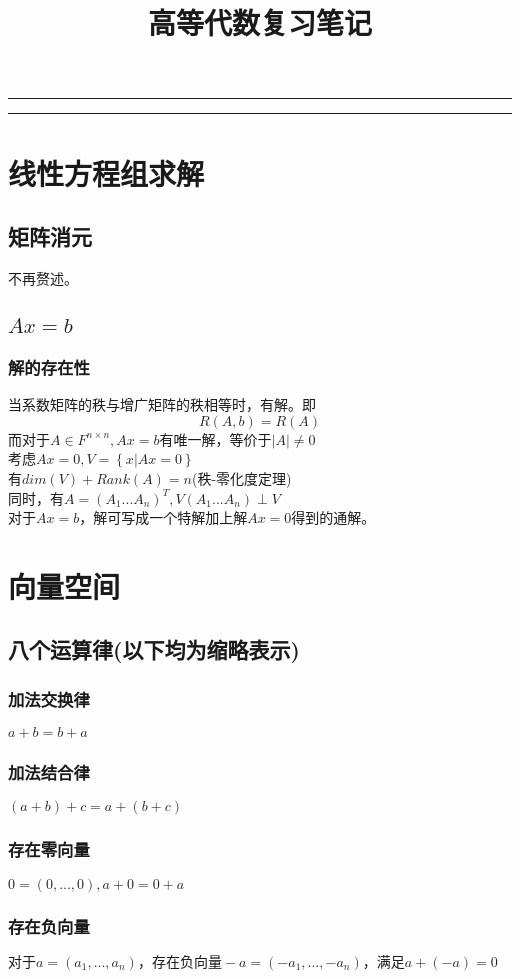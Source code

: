 \documentclass[UTF8]{ctexart}
\title{高等代数复习笔记}
\date{}
\begin{document}
    \maketitle
    \pagestyle{plain}
    \hrule
    \tableofcontents
    \hrule
    \section{线性方程组求解}
    \subsection{矩阵消元}不再赘述。
    \subsection{$Ax=b$}
    \subsubsection{解的存在性}
    当系数矩阵的秩与增广矩阵的秩相等时，有解。即
    \[\displaystyle R(A,b)=R(A) \]
    \indent
    而对于$A\in F^{n\times n},Ax=b$有唯一解，等价于$|A|\neq 0$\\
    \indent
    考虑$Ax=0,V=\left\{{x|Ax=0}\right\}$\\
    \indent
    有$dim(V)+Rank(A)=n$(秩-零化度定理)\\
    \indent
    同时，有$A=(A_1...A_n)^T,V(A_1...A_n)\perp V$\\
    \indent
    对于$Ax=b$，解可写成一个特解加上解$Ax=0$得到的通解。
    \section{向量空间}
    \subsection{八个运算律(以下均为缩略表示)}
    \subsubsection{加法交换律}$a+b=b+a$
    \subsubsection{加法结合律}$(a+b)+c=a+(b+c)$
    \subsubsection{存在零向量}$0=(0,...,0),a+0=0+a$
    \subsubsection{存在负向量}$对于a=(a_1,...,a_n)，存在负向量-a=(-a_1,...,-a_n)，满足a+(-a)=0$
\end{document}
